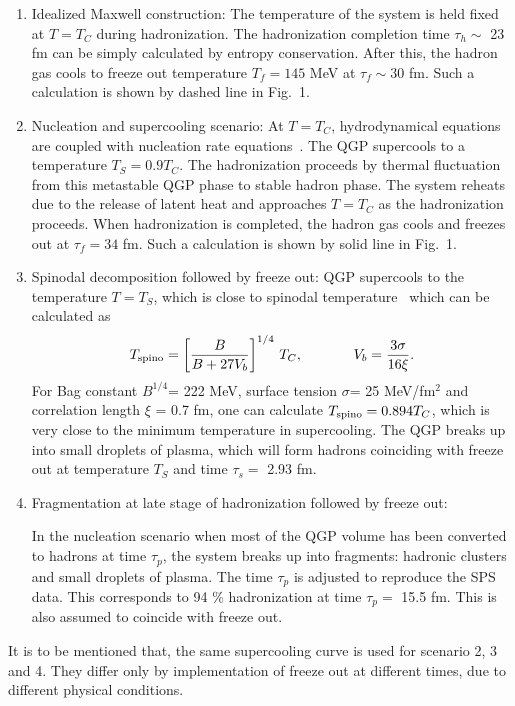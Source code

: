 \begin{enumerate}

\item Idealized Maxwell construction:
    The temperature of the system is held fixed at $T=T_C$ 
    during hadronization. The hadronization completion time 
    $\tau_h\sim$ 23 fm can be simply calculated by entropy conservation.
    After this, the hadron gas cools to freeze out temperature 
    $T_f=145$ MeV at $\tau_f\sim 30$ fm. Such a calculation is shown by 
    dashed line in Fig.~1.

\item  Nucleation and supercooling scenario:
   At $T=T_C$, hydrodynamical equations are coupled with nucleation 
  rate equations~\cite{SPINO}. The QGP supercools to a temperature 
  $T_S=0.9T_C$. The hadronization proceeds by 
 thermal fluctuation from this metastable QGP phase to stable hadron phase. 
 The system reheats due to the release of latent heat and approaches
 $T=T_C$ as the hadronization proceeds. When hadronization is completed,  
 the hadron gas cools and freezes out at $\tau_f=34$ fm.
 Such a calculation is shown by solid line in Fig.~1.

\item Spinodal decomposition followed by freeze out:
  QGP supercools to the temperature $T=T_S$, which is close to spinodal 
  temperature~\cite{SPINO} which can be calculated as 
\begin{equation} 
T_{\rm spino}= \left[{B \over B+ 27 V_b} \right]^{1/4} \, T_C, 
  \hspace{.5in} V_b = {3\sigma \over 16 \xi}.
\end{equation}
For Bag constant $B^{1/4}$= 222 MeV,
surface tension $\sigma$= 25 MeV/fm$^2$ and correlation length $\xi$ = 0.7 fm,
one can calculate 
$T_{\rm spino}=0.894 T_C$, which is very close to the minimum temperature
in supercooling. 
 The QGP breaks up into small droplets of plasma, which will form 
hadrons coinciding with freeze out at temperature $T_S$ and
time $\tau_s=$ 2.93 fm.


\item Fragmentation at late stage of hadronization followed by freeze out:

  In the nucleation scenario when most of the QGP volume has been 
converted to hadrons at time $\tau_p$, the system breaks up into fragments: 
hadronic clusters and small droplets of plasma. 
 The time $\tau_p$ is adjusted to reproduce the SPS data. This 
corresponds to 94 \%  hadronization at time $\tau_p=$ 15.5 fm.
This is also assumed to coincide with freeze out.
\end{enumerate}
 It is to be mentioned that, the same supercooling curve is used for 
scenario 2, 3 and 4. They differ only by implementation of freeze
out at different times, due to different physical conditions.

